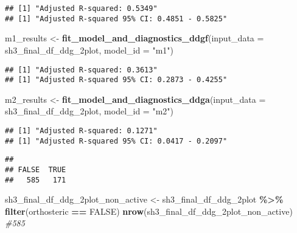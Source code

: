 \documentclass[
]{article}
\newenvironment{Shaded}{\begin{snugshade}}{\end{snugshade}}
\newcommand{\AttributeTok}[1]{\textcolor[rgb]{0.13,0.29,0.53}{#1}}
\newcommand{\CommentTok}[1]{\textcolor[rgb]{0.56,0.35,0.01}{\textit{#1}}}
\newcommand{\ConstantTok}[1]{\textcolor[rgb]{0.56,0.35,0.01}{#1}}
\newcommand{\DocumentationTok}[1]{\textcolor[rgb]{0.56,0.35,0.01}{\textbf{\textit{#1}}}}
\newcommand{\FunctionTok}[1]{\textcolor[rgb]{0.13,0.29,0.53}{\textbf{#1}}}
\newcommand{\NormalTok}[1]{#1}
\newcommand{\OtherTok}[1]{\textcolor[rgb]{0.56,0.35,0.01}{#1}}
\newcommand{\SpecialCharTok}[1]{\textcolor[rgb]{0.81,0.36,0.00}{\textbf{#1}}}
\newcommand{\StringTok}[1]{\textcolor[rgb]{0.31,0.60,0.02}{#1}}
\begin{document}
\begin{verbatim}
## [1] "Adjusted R-squared: 0.5349"
## [1] "Adjusted R-squared 95% CI: 0.4851 - 0.5825"
\end{verbatim}

\begin{Shaded}
\begin{Highlighting}[]
\NormalTok{m1\_results }\OtherTok{\textless{}{-}} \FunctionTok{fit\_model\_and\_diagnostics\_ddgf}\NormalTok{(}\AttributeTok{input\_data =}\NormalTok{ sh3\_final\_df\_ddg\_2plot, }\AttributeTok{model\_id =} \StringTok{"m1"}\NormalTok{)}
\end{Highlighting}
\end{Shaded}

\begin{verbatim}
## [1] "Adjusted R-squared: 0.3613"
## [1] "Adjusted R-squared 95% CI: 0.2873 - 0.4255"
\end{verbatim}

\begin{Shaded}
\begin{Highlighting}[]
\NormalTok{m2\_results }\OtherTok{\textless{}{-}} \FunctionTok{fit\_model\_and\_diagnostics\_ddga}\NormalTok{(}\AttributeTok{input\_data =}\NormalTok{ sh3\_final\_df\_ddg\_2plot, }\AttributeTok{model\_id =} \StringTok{"m2"}\NormalTok{)}
\end{Highlighting}
\end{Shaded}

\begin{verbatim}
## [1] "Adjusted R-squared: 0.1271"
## [1] "Adjusted R-squared 95% CI: 0.0417 - 0.2097"
\end{verbatim}

\begin{Shaded}
\end{Shaded}

\begin{verbatim}
## 
## FALSE  TRUE 
##   585   171
\end{verbatim}

\begin{Shaded}
\begin{Highlighting}[]
\NormalTok{sh3\_final\_df\_ddg\_2plot\_non\_active }\OtherTok{\textless{}{-}}\NormalTok{ sh3\_final\_df\_ddg\_2plot }\SpecialCharTok{\%\textgreater{}\%} \FunctionTok{filter}\NormalTok{(orthosteric }\SpecialCharTok{==} \ConstantTok{FALSE}\NormalTok{)}
\FunctionTok{nrow}\NormalTok{(sh3\_final\_df\_ddg\_2plot\_non\_active) }\CommentTok{\#585}
\end{Highlighting}
\end{Shaded}
\end{document}
